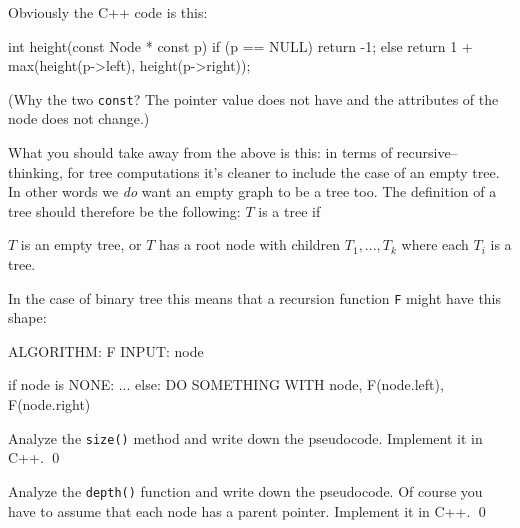 Obviously the C++ code is this:
{\small
\begin{console}
int height(const Node * const p)
{
    if (p == NULL)
    {
        return -1;
    }
    else
    {
        return 1 + max(height(p->left), height(p->right));
    }
}
\end{console}
}
(Why the two \verb!const!? 
The pointer value does not have and the attributes of the node
does not change.)

What you should take away from the above
is this: 
in terms of 
recursive--thinking, for tree computations it's cleaner
to include the case of an empty tree.
In other words we \textit{do} want an empty graph to be a tree too.
The definition of a tree should therefore be the following:
$T$ is a tree if
\begin{itemize}
\li $T$ is an empty tree, or
\li $T$ has a root node with children $T_1, ..., T_k$ 
where each $T_i$ is a tree.
\end{itemize}
In the case of binary tree this means that a recursion
function \verb$F$ might have this shape:
\begin{console}
ALGORITHM: F
INPUT:     node

if node is NONE:
    ...
else:
    DO SOMETHING WITH node, F(node.left), F(node.right)
\end{console}

\begin{ex}
Analyze the \verb!size()! method and write down the
pseudocode. Implement it in C++.
\qed
\end{ex}

\begin{ex}
Analyze the \verb!depth()! function and write down the
pseudocode. Of course you have to assume that 
each node has a parent pointer.
Implement it in C++.
\qed
\end{ex}

